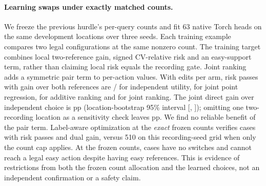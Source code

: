 \paragraph{Learning swaps under exactly matched counts.}
We freeze the previous hurdle's per-query counts and fit 63 native Torch
heads on the same development locations over three seeds. Each training
example compares two legal configurations at the same nonzero count.
The training target combines local two-reference gain, signed CV-relative
risk and an easy-support term, rather than claiming local risk equals the
recording gate. Joint ranking adds a symmetric pair term to per-action
values. With \MatchedSwapCount{} edits per arm, risk passes with gain
over both references are \MatchedSwapIndependent{}/\MatchedSwapViews{}
for independent utility, \MatchedSwapPointFit{} for joint point regression,
\MatchedSwapAdditive{} for additive ranking and \MatchedSwapJoint{} for
joint ranking. The joint direct gain over independent choice is
\MatchedSwapEffect{} pp (location-bootstrap 95\% interval
[\MatchedSwapLow{}, \MatchedSwapHigh{}]); omitting one two-recording
location as a sensitivity check leaves \MatchedSwapWithout{} pp.
We find no reliable benefit of the pair term. Label-aware optimization
at the \emph{exact} frozen counts verifies \MatchedSwapCapacity{} cases
with risk passes and dual gain, versus 510 on this recording-seed grid
when only the count cap applies. At the frozen counts, \MatchedSwapNoEdit{}
cases have no switches and \MatchedSwapNoEasy{} cannot reach a legal easy
action despite having easy references. This is evidence of restrictions
from both the frozen count allocation and the learned choices, not an
independent confirmation or a safety claim.
